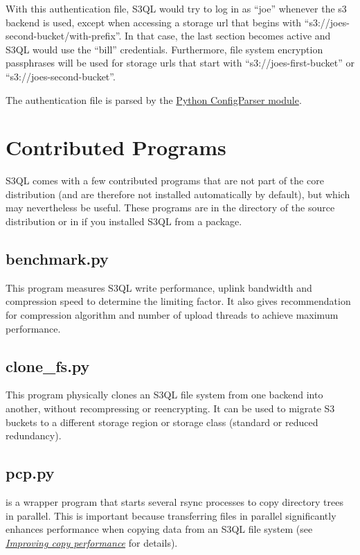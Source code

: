 \documentclass[letterpaper,10pt,english]{sphinxmanual}
\begin{document}
With this authentication file, S3QL would try to log in as ``joe''
whenever the s3 backend is used, except when accessing a storage url
that begins with ``s3://joes-second-bucket/with-prefix''. In that case,
the last section becomes active and S3QL would use the ``bill''
credentials. Furthermore, file system encryption passphrases will be used
for storage urls that start with ``s3://joes-first-bucket'' or
``s3://joes-second-bucket''.

The authentication file is parsed by the \href{http://docs.python.org/library/configparser.html}{Python ConfigParser
module}.


\chapter{Contributed Programs}
\label{contrib::doc}\label{contrib:contributed-programs}
S3QL comes with a few contributed programs that are not part of the
core distribution (and are therefore not installed automatically by
default), but which may nevertheless be useful. These programs are in
the  directory of the source distribution or in
 if you installed S3QL from a package.


\section{benchmark.py}
\label{contrib:benchmark-py}
This program measures S3QL write performance, uplink bandwidth and
compression speed to determine the limiting factor. It also gives
recommendation for compression algorithm and number of upload threads
to achieve maximum performance.


\section{clone\_fs.py}
\label{contrib:clone-fs-py}
This program physically clones an S3QL file system from one backend
into another, without recompressing or reencrypting.  It can be used to
migrate S3 buckets to a different storage region or storage class
(standard or reduced redundancy).


\section{pcp.py}
\label{contrib:pcp}\label{contrib:pcp-py}
 is a wrapper program that starts several rsync processes to
copy directory trees in parallel. This is important because
transferring files in parallel significantly enhances performance when
copying data from an S3QL file system (see {\hyperref[tips:copy-performance]{\emph{Improving copy performance}}} for
details).
\end{document}
